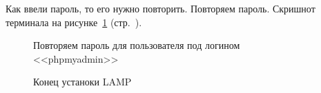 Как ввели пароль, то его нужно повторить. Повторяем пароль. Скришнот терминала на рисунке~\ref{fig:sudo-apt-install-apache2-step-5} (стр.~\pageref{fig:sudo-apt-install-apache2-step-5}).

\begin{figure}[!htp]
    \caption{Повторяем пароль для пользователя под логином <<phpmyadmin>>}
    \label{fig:sudo-apt-install-apache2-step-5}
\end{figure}

\begin{figure}[!htp]
    \caption{Конец устаноки LAMP}
    \label{fig:sudo-apt-install-apache2-step-6}
\end{figure}

